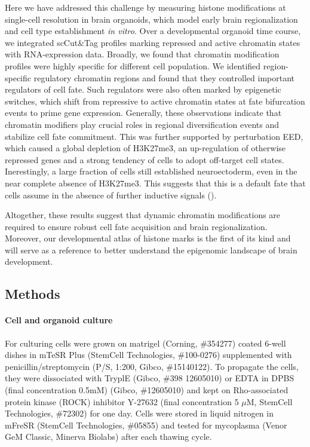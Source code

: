 Here we have addressed this challenge by measuring histone modifications at single-cell resolution in brain organoids, which model early brain regionalization and cell type establishment \textit{in vitro}. Over a developmental organoid time course, we integrated scCut\&Tag profiles marking repressed and active chromatin states with RNA-expression data. Broadly, we found that chromatin modification profiles were highly specific for different cell population. We identified region-specific regulatory chromatin regions and found that they controlled important regulators of cell fate. Such regulators were also often marked by epigenetic switches, which shift from repressive to active chromatin states at fate bifurcation events to prime gene expression. Generally, these observations indicate that chromatin modifiers play crucial roles in regional diversification events and stabilize cell fate commitment. This was further supported by perturbation EED, which caused a global depletion of H3K27me3, an up-regulation of otherwise repressed genes and a strong tendency of cells to adopt off-target cell states. Inerestingly, a large fraction of cells still established neuroectoderm, even in the near complete absence of H3K27me3. This suggests that this is a default fate that cells assume in the absence of further inductive signals (\cite{argelaguet_multi-omics_2019,munoz-sanjuan_neural_2002}).  

Altogether, these results suggest that dynamic chromatin modifications are required to ensure robust cell fate acquisition and brain regionalization. Moreover, our developmental atlas of histone marks is the first of its kind and will serve as a reference to better understand the epigenomic landscape of brain development.




\subsection{Methods}

\paragraph{Cell and organoid culture}
For culturing cells were grown on matrigel (Corning, \#354277) coated 6-well dishes in mTeSR Plus (StemCell Technologies, \#100-0276) supplemented with penicillin/streptomycin (P/S, 1:200, Gibco, \#15140122). To propagate the cells, they were dissociated with TryplE (Gibco, \#398 12605010) or EDTA in DPBS (final concentration 0.5mM) (Gibco, \#12605010) and kept on Rho-associated protein kinase (ROCK) inhibitor Y-27632 (final concentration 5 $\mu$M, StemCell Technologies, \#72302) for one day. Cells were stored in liquid nitrogen in mFreSR (StemCell Technologies, \#05855) and tested for mycoplasma (Venor GeM Classic, Minerva Biolabs) after each thawing cycle. 

